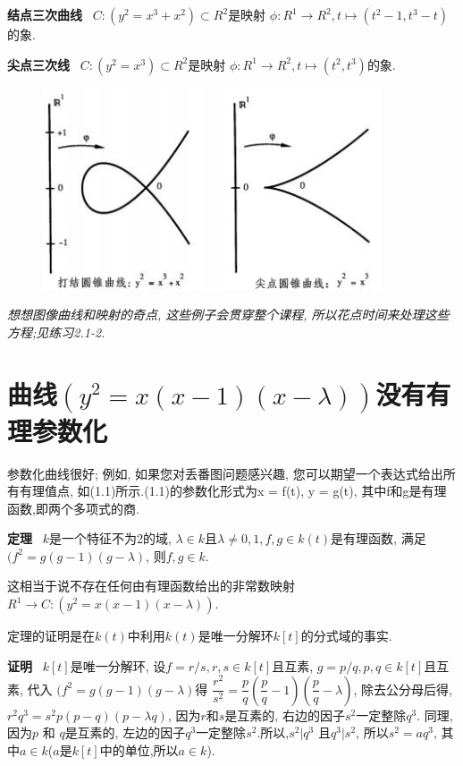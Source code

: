 \documentclass[UTF8]{book}
\begin{document}
	
		\textbf{结点三次曲线} \ $C:(y^{2}=x^{3}+x^{2})\subset R^{2}$是映射 $\phi:R^{1}\rightarrow R^{2} , t\longmapsto(t^{2}-1,t^{3}-t) $的象.
		
		\textbf{尖点三次线} \ $C:(y^{2}=x^{3})\subset R^{2}$是映射 $\phi:R^{1}\rightarrow R^{2} , t\longmapsto(t^{2},t^{3}) $的象.
		
		\begin{figure}[h]
		  \centering
		  \includegraphics[width=10cm]{27.jpg} \\
		\end{figure}
		
		\textit{想想图像曲线和映射的奇点, 这些例子会贯穿整个课程, 所以花点时间来处理这些方程;见\textit{练习2.1-2}.}

	\section{曲线$(y^{2}=x(x-1)(x-\lambda))$没有有理参数化}
		参数化曲线很好; 例如, 如果您对丢番图问题感兴趣, 您可以期望一个表达式给出所有有理值点, 如(1.1)所示.(1.1)的参数化形式为x = f(t), y = g(t), 其中f和g是有理函数,即两个多项式的商.
		
		\textbf{定理} \ $ k $是一个特征不为2的域, $\lambda\in k$且$\lambda\neq0,1,f,g\in k(t)$是有理函数, 满足$(f^{2}=g(g-1)(g-\lambda)$, 则$f,g\in k$.
		
		
		这相当于说不存在任何由有理函数给出的非常数映射$R^{1}\rightarrow C: (y^{2}=x(x-1)(x-\lambda))$.
		
		
		定理的证明是在$ k(t) $中利用$ k(t) $是唯一分解环$ k[t] $的分式域的事实.
		
		
		\textbf{证明} \ $ k[t] $是唯一分解环, 设$f=r/s,  r,s\in k[t]$且互素, $g=p/q,  p,q\in k[t]$且互素, 代入 $(f^{2}=g(g-1)(g-\lambda)$得
		$\dfrac{r^{2}}{s^{2}}=\dfrac{p}{q}(\dfrac{p}{q}-1)(\dfrac{p}{q}-\lambda)$, 除去公分母后得, $r^{2}q^{3}=s^{2}p(p-q)(p-\lambda q)$, 因为$ r $和$ s $是互素的, 右边的因子$s^{2}$一定整除$q^{3}$. 同理,因为$ p$ 和 $q $是互素的, 左边的因子$q^{3}$一定整除$s^{2}$.所以,$s^{2}|q^{3}$ 且$q^{3}|s^{2}$, 所以$s^{2}=aq^{3}$, 其中$a\in k$($ a $是$ k[t] $中的单位,所以$a\in k$).
		
\end{document}
